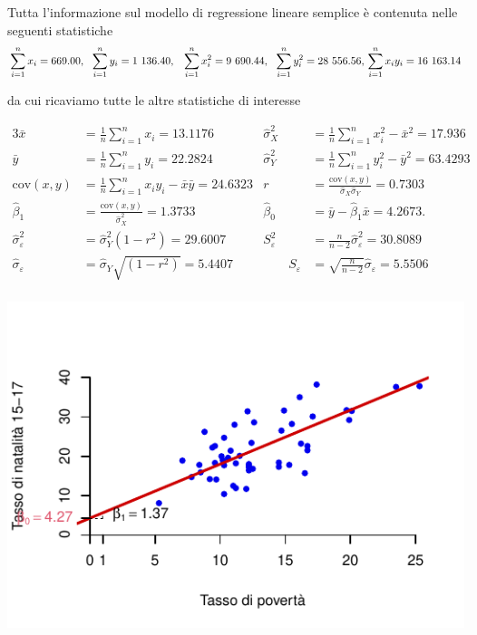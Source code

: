 \documentclass[
  11pt,
]{book}
\theoremstyle{mytheoremstyle}
\theoremstyle{mydefstyle}
\begin{document}
Tutta l'informazione sul modello di regressione lineare semplice è contenuta nelle
seguenti statistiche
\[
\sum_{i=1}^n x_i=        669.00,
~~\sum_{i=1}^n y_i=      1~136.40,\\
~~\sum_{i=1}^n x_i^2=    9~690.44,
~~\sum_{i=1}^ny_i^2=     28~556.56,\\
\sum_{i=1}^n x_i y_i= 16~163.14
\]

da cui ricaviamo tutte le altre statistiche di interesse

\begin{alignat*}{3}
 \bar x & =  \frac 1 n \sum_{i=1}^n x_i  = 13.1176 &
\hat\sigma_X^2 & =  \frac 1 n \sum_{i=1}^n x_i^2 - \bar x^2  = 17.936 &\\
 \bar y & =  \frac 1 n \sum_{i=1}^n y_i   = 22.2824 &
\hat\sigma_Y^2 & =  \frac 1 n \sum_{i=1}^n y_i^2 - \bar y^2  = 63.4293 &\\
 \text{cov}(x,y) & = \frac 1 n \sum_{i=1}^n x_iy_i -\bar x\bar y  = 24.6323 & 
r & = \frac{\text{cov}(x,y)}{\hat\sigma_X \hat\sigma_Y }  = 0.7303 &\\
\hat\beta_1 & = \frac{\text{cov}(x,y)}{\hat\sigma_X^2} = 1.3733 & 
\hat\beta_0 & = \bar y  - \hat\beta_1\bar x = 4.2673. &\\
\hat\sigma_\varepsilon^2 & = \hat\sigma_Y^2(1-r^2)=29.6007 &
S_\varepsilon^2 & = \frac{n}{n-2}\hat\sigma_\varepsilon^2 = 30.8089\\
\hat\sigma_\varepsilon & = \hat\sigma_Y\sqrt{(1-r^2)}=5.4407 & \qquad
S_\varepsilon & = \sqrt{\frac{n}{n-2}}\hat\sigma_\varepsilon = 5.5506\\
\end{alignat*}

\begin{center}\includegraphics{Esami_passati_con_soluzioni_files/figure-latex/06-regr-46-1} \end{center}
\end{document}

